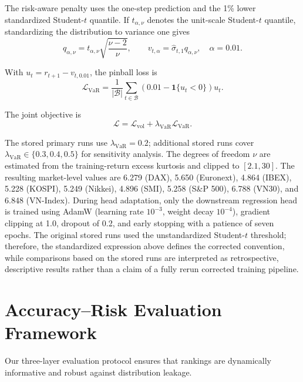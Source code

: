 \documentclass[runningheads]{llncs}
\begin{document}
The risk-aware penalty uses the one-step prediction and the 1\% lower standardized Student-$t$ quantile. If $t_{\alpha,\nu}$ denotes the unit-scale Student-$t$ quantile, standardizing the distribution to variance one gives
\begin{equation}
q_{\alpha,\nu}=t_{\alpha,\nu}\sqrt{\frac{\nu-2}{\nu}}, \qquad
v_{t,\alpha}=\hat{\sigma}_{t,1}q_{\alpha,\nu}, \quad \alpha=0.01.
\end{equation}

With $u_t = r_{t+1} - v_{t,0.01}$, the pinball loss \cite{ref9} is
\begin{equation}
\mathcal{L}_{\text{VaR}} = \frac{1}{|\mathcal{B}|} \sum_{t\in\mathcal{B}} \left(0.01 - \mathbf{1}\{u_t < 0\}\right) u_t.
\end{equation}

The joint objective is
\begin{equation}
\mathcal{L} = \mathcal{L}_{\text{vol}} + \lambda_{\text{VaR}} \mathcal{L}_{\text{VaR}}.
\end{equation}

The stored primary runs use $\lambda_{\text{VaR}}=0.2$; additional stored runs cover $\lambda_{\text{VaR}}\in\{0.3,0.4,0.5\}$ for sensitivity analysis. The degrees of freedom $\nu$ are estimated from the training-return excess kurtosis and clipped to $[2.1,30]$. The resulting market-level values are 6.279 (DAX), 5.650 (Euronext), 4.864 (IBEX), 5.228 (KOSPI), 5.249 (Nikkei), 4.896 (SMI), 5.258 (S\&P 500), 6.788 (VN30), and 6.848 (VN-Index). During head adaptation, only the downstream regression head is trained using AdamW (learning rate $10^{-3}$, weight decay $10^{-4}$), gradient clipping at 1.0, dropout of 0.2, and early stopping with a patience of seven epochs. The original stored runs used the unstandardized Student-$t$ threshold; therefore, the standardized expression above defines the corrected convention, while comparisons based on the stored runs are interpreted as retrospective, descriptive results rather than a claim of a fully rerun corrected training pipeline.

\section{Accuracy--Risk Evaluation Framework}
Our three-layer evaluation protocol ensures that rankings are dynamically informative and robust against distribution leakage.
\end{document}

